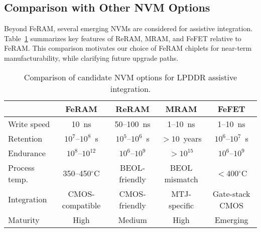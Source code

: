 \subsection{Comparison with Other NVM Options}
Beyond FeRAM, several emerging NVMs are considered for assistive integration.
Table~\ref{tab:nvm_comparison} summarizes key features of ReRAM, MRAM, and FeFET relative to FeRAM.
This comparison motivates our choice of FeRAM chiplets for near-term manufacturability, while clarifying future upgrade paths.

\begin{table}[t]
  \centering
  \caption{Comparison of candidate NVM options for LPDDR assistive integration.}
  \label{tab:nvm_comparison}
  \vspace{2pt}
  \small
  \setlength{\tabcolsep}{4pt}
  \begin{tabular}{@{}lcccc@{}}
    \toprule
    & FeRAM & ReRAM & MRAM & FeFET \\
    \midrule
    Write speed & 10~ns & 50--100~ns & 1--10~ns & 1--10~ns \\
    Retention   & $10^7$--$10^8$~s & $10^5$--$10^6$~s & $>10$~years & $10^6$--$10^7$~s \\
    Endurance   & $10^8$--$10^{12}$ & $10^6$--$10^9$ & $>10^{15}$ & $10^6$--$10^9$ \\
    Process temp. & 350--450$^\circ$C & BEOL-friendly & BEOL mismatch & $<$400$^\circ$C \\
    Integration  & CMOS-compatible & CMOS-friendly & MTJ-specific & Gate-stack CMOS \\
    Maturity     & High & Medium & High & Emerging \\
    \bottomrule
  \end{tabular}
\end{table}
